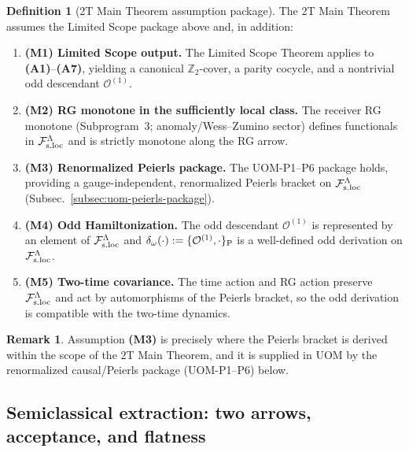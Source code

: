 \documentclass[10pt]{article}
\theoremstyle{definition}
\newtheorem{definition}{Definition}[section]
\newtheorem{remark}{Remark}[section]
\theoremstyle{plain}
\begin{document}
\begin{definition}[2T Main Theorem assumption package]
\label{def:uom-main-theorem-assumptions}
The 2T Main Theorem assumes the Limited Scope package above and, in addition:
\begin{enumerate}[label=\textbf{(M\arabic*)},leftmargin=*,itemsep=0.4em]
\item \textbf{(M1) Limited Scope output.}
The Limited Scope Theorem applies to \textbf{(A1)}--\textbf{(A7)},
yielding a canonical $\mathbb Z_2$-cover, a parity cocycle, and a nontrivial odd descendant
$\mathcal O^{(1)}$.

\item \textbf{(M2) RG monotone in the sufficiently local class.}
The receiver RG monotone (Subprogram~3; anomaly/Wess--Zumino sector) defines functionals in
$\mathcal F_{\rm s.loc}^\Lambda$ and is strictly monotone along the RG arrow.

\item \textbf{(M3) Renormalized Peierls package.}
The UOM-P1--P6 package holds, providing a gauge-independent, renormalized Peierls bracket on
$\mathcal F_{\rm s.loc}^\Lambda$ (Subsec.~\ref{subsec:uom-peierls-package}).

\item \textbf{(M4) Odd Hamiltonization.}
The odd descendant $\mathcal O^{(1)}$ is represented by an element of $\mathcal F_{\rm s.loc}^\Lambda$ and
$\delta_\omega(\cdot):=\{\mathcal O^{(1)},\cdot\}_{\rm P}$ is a well-defined odd derivation on
$\mathcal F_{\rm s.loc}^\Lambda$.

\item \textbf{(M5) Two-time covariance.}
The time action and RG action preserve $\mathcal F_{\rm s.loc}^\Lambda$ and act by automorphisms of the
Peierls bracket, so the odd derivation is compatible with the two-time dynamics.
\end{enumerate}
\end{definition}

\begin{remark}
Assumption \textbf{(M3)} is precisely where the Peierls bracket is derived within the scope of the 2T Main Theorem,
and it is supplied in UOM by the renormalized causal/Peierls package (UOM-P1--P6) below.
\end{remark}

\subsection{Semiclassical extraction: two arrows, acceptance, and flatness}
\label{subsec:two-times-semiclassical-extraction}
\end{document}
